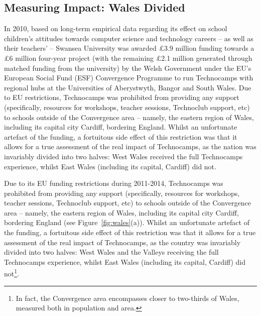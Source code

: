 \subsection{Measuring Impact: Wales Divided}\label{walesdivided}

In 2010, based on long-term empirical data regarding its effect on
school children's attitudes towards computer science and technology
careers -- as well as their teachers' -- Swansea University was
awarded \pounds 3.9 million funding towards a \pounds 6 million
four-year project (with the remaining \pounds 2.1 million generated
through matched funding from the university) by the Welsh Government
under the EU's European Social Fund (ESF) Convergence Programme to run
Technocamps with regional hubs at the Universities of Aberystwyth,
Bangor and South Wales.  Due to EU restrictions, Technocamps was
prohibited from providing any support (specifically, resources for
workshops, teacher sessions, Technoclub support, etc) to schools
outside of the Convergence area -- namely, the eastern region of
Wales, including its capital city Cardiff, bordering England.  Whilst
an unfortunate artefact of the funding, a fortuitous side effect of
this restriction was that it allows for a true assessment of the real
impact of Technocamps, as the nation was invariably divided into two
halves: West Wales received the full Technocamps experience, whilst
East Wales (including its capital, Cardiff) did not.

Due to its EU funding restrictions during 2011-2014, Technocamps was
prohibited from providing any support (specifically, resources for
workshops, teacher sessions, Technoclub support, etc) to schools
outside of the Convergence area -- namely, the eastern region of
Wales, including its capital city Cardiff, bordering England (see
Figure~\ref{fig:wales}(a)). Whilst an unfortunate artefact of the
funding, a fortuitous side effect of this restriction was that it
allows for a true assessment of the real impact of Technocamps, as the
country was invariably divided into two halves: West Wales and the
Valleys receiving the full Technocamps experience, whilst East Wales
(including its capital, Cardiff) did not\footnote{In fact, the
Convergence area encompasses closer to two-thirds of Wales, measured
both in population and area.}.

